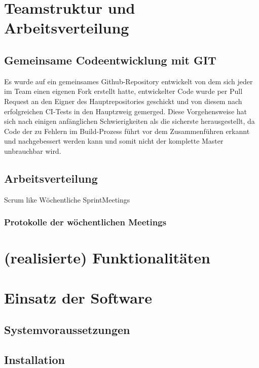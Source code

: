 \documentclass[12pt,a4paper]{scrreprt}
\begin{document}
\chapter{Teamstruktur und Arbeitsverteilung}
\section{Gemeinsame Codeentwicklung mit GIT}
Es wurde auf ein gemeinsames Github-Repository entwickelt von dem sich jeder im Team einen eigenen Fork erstellt hatte, entwickelter Code wurde per Pull Request an den Eigner des Hauptrepositories geschickt und von diesem nach erfolgreichen CI-Tests in den Hauptzweig gemerged. Diese Vorgehensweise hat sich nach einigen anfänglichen Schwierigkeiten als die sicherste herausgestellt, da Code der zu Fehlern im Build-Prozess führt vor dem Zusammenführen erkannt und nachgebessert werden kann und somit nicht der komplette Master unbrauchbar wird.
\section{Arbeitsverteilung}
Scrum like
Wöchentliche \glqq Sprint\grqq Meetings
\subsection{Protokolle der wöchentlichen Meetings}

\chapter{(realisierte) Funktionalitäten}
\chapter{Einsatz der Software}
\section{Systemvoraussetzungen}
\section{Installation}
\end{document}
